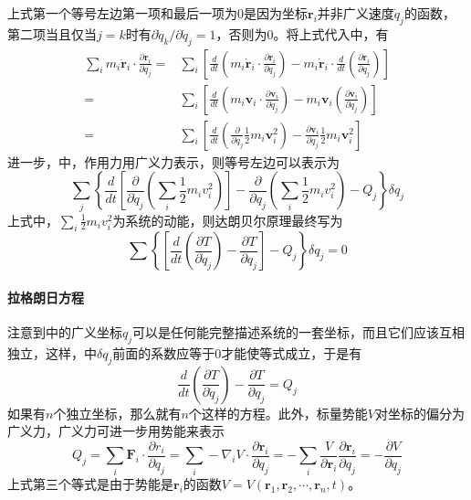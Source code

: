 上式第一个等号左边第一项和最后一项为0是因为坐标$\bm{r}_i$并非广义速度$\dot{q}_j$的函数，第二项当且仅当$j = k$时有$\partial \dot{q}_k / \partial \dot{q}_j = 1$，否则为0。将上式代入中，有
\begin{equation}
	\begin{aligned}
	\sum_{i} m_i \ddot{\bm{r}}_i\cdot\frac{\partial\bm{r}_i}{\partial q_j}
	=& \sum_{i}\left[\frac{d}{dt}\left(m_i\dot{\bm{r}}_i\cdot\frac{\partial\bm{r}_i}{\partial q_j}\right) - m_i\dot{\bm{r}}_i\cdot\frac{d}{dt}\left(\frac{\partial\bm{r}_i}{\partial q_j}\right)\right] \\
	=& \sum_{i}\left[\frac{d}{dt}\left(m_i\bm{v}_i\cdot\frac{\partial\bm{v}_i}{\partial \dot{q}_j}\right) - m_i\bm{v}_i\left(\frac{\partial\bm{v}_i}{\partial \dot{q}_j}\right)\right] \\
	=& \sum_{i}\left[\frac{d}{dt}\left(\frac{\partial}{\partial \dot{q}_j} \frac{1}{2}m_i\bm{v}_i^2\right) -\frac{\partial\bm{v}_i}{\partial q_j}\frac{1}{2} m_i\bm{v}_i^2\right]
	\end{aligned}
\end{equation}
进一步，中，作用力用广义力表示，则等号左边可以表示为
\begin{equation*}
	\sum_{j} \left\{\frac{d}{dt}\left[\frac{\partial}{\partial \dot{q}_j}\left(\sum_{i}\frac{1}{2}m_i v_i^2\right)\right] - \frac{\partial}{\partial q_j}\left(\sum_i \frac{1}{2}m_i v_i^2\right) - Q_j\right\}\delta q_j
\end{equation*}
上式中，$\sum_{i} \frac{1}{2}m_i v_i^2$为系统的动能，则达朗贝尔原理最终写为
\begin{equation}
	\sum \left\{ \left[\frac{d}{dt}\left(\frac{\partial T}{\partial \dot{q}_j}\right) - \frac{\partial T}{\partial q_j}\right] - Q_j \right\} \delta q_j = 0
	\label{eq:genera-dalember}
\end{equation}

\paragraph*{拉格朗日方程}
注意到中的广义坐标$q_j$可以是任何能完整描述系统的一套坐标，而且它们应该互相独立，这样，中$\delta q_j$前面的系数应等于0才能使等式成立，于是有
\begin{equation}
	\frac{d}{dt} \left(\frac{\partial T}{\partial \dot{q}_j}\right) - \frac{\partial T}{\partial q_j} = Q_j
	\label{eq:genera-kin-force}
\end{equation}
如果有$n$个独立坐标，那么就有$n$个这样的方程。此外，标量势能$V$对坐标的偏分为广义力，广义力可进一步用势能来表示
\begin{equation}
	Q_j = \sum_{i} \bm{F}_i \cdot \frac{\partial r_i}{\partial q_j} = \sum_{i} -\nabla_i V \cdot \frac{\partial \bm{r}_i}{\partial q_j} = - \sum_{i} \frac{V}{\partial \bm{r}_i} \frac{\partial \bm{r}_i}{\partial q_j} = - \frac{\partial V}{\partial q_j}
\end{equation}
上式第三个等式是由于势能是$\bm{r}_i$的函数$V = V(\bm{r}_1, \bm{r}_2, \cdots, \bm{r}_n, t)$。

